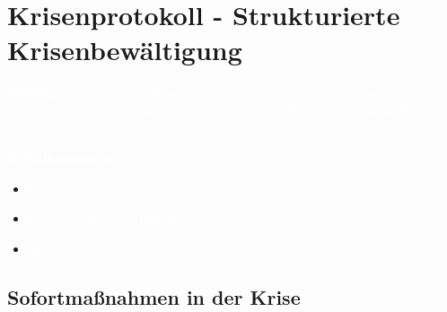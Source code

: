 
\section{Krisenprotokoll - Strukturierte Krisenbewältigung}
\label{sec:krisenprotokoll}

\begin{ctmmRedBox}[title=\textcolor{white}{CTMM Krisenprotokoll v5.5}]

\textcolor{white}{\textbf{Wichtig:} Dieses Protokoll dient der strukturierten Dokumentation und Nachbereitung von Krisensituationen. Es ersetzt NICHT professionelle Hilfe in akuten Notfällen.}

\vspace{0.5em}

\textcolor{white}{\textbf{Notfallnummern:}}
\begin{itemize}
    \item[\textcolor{white}{*}] \textcolor{white}{Rettungsdienst: 112}
    \item[\textcolor{white}{*}] \textcolor{white}{Krisentelefon: 0800 111 0 111}
    \item[\textcolor{white}{*}] \textcolor{white}{Therapeut/in: \TextField[name=crisis_therapist_number,width=6cm,height=1em,bordercolor={1 1 1},backgroundcolor={0.9 0.9 0.9}]{}}
\end{itemize}

\end{ctmmRedBox}

\subsection{Sofortmaßnahmen in der Krise}

